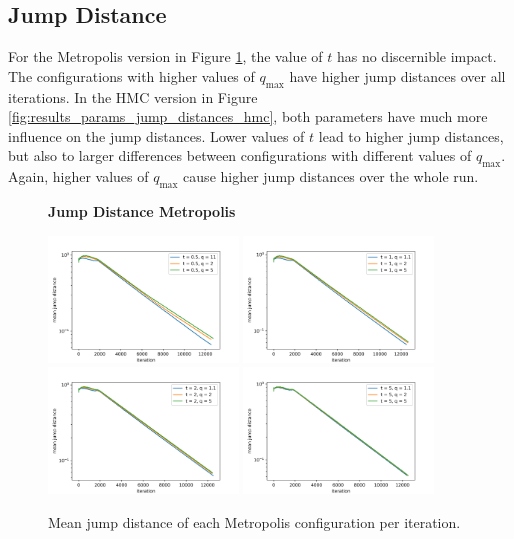 \documentclass[12pt, a4paper]{report}
\begin{document}
\subsection{Jump Distance}
For the Metropolis version in Figure \ref{fig:results_params_jump_distances_metropolis}, the value of $t$ has no discernible impact.
The configurations with higher values of $q_{\textrm{max}}$ have higher jump distances over all iterations.
In the HMC version in Figure \ref{fig:results_params_jump_distances_hmc}, both parameters have much more influence on the jump distances.
Lower values of $t$ lead to higher jump distances, but also to larger differences between configurations with different values of $q_{\textrm{max}}$.
Again, higher values of  $q_{\textrm{max}}$ cause higher jump distances over the whole run.
\begin{figure}
    \centering
    {\small \textbf{Jump Distance Metropolis} \par}
    \includegraphics[width=0.45\textwidth]{figs/results/params/jump_distances_metropolis_t_05}
    \includegraphics[width=0.45\textwidth]{figs/results/params/jump_distances_metropolis_t_1}
    \includegraphics[width=0.45\textwidth]{figs/results/params/jump_distances_metropolis_t_2}
    \includegraphics[width=0.45\textwidth]{figs/results/params/jump_distances_metropolis_t_5}
    \caption{Mean jump distance of each Metropolis configuration per iteration.}
    \label{fig:results_params_jump_distances_metropolis}
\end{figure}
\end{document}
